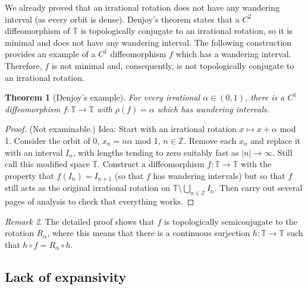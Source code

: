 \documentclass[12pt]{article}
\newtheorem{theorem}{Theorem}[section]
\theoremstyle{definition}
\theoremstyle{remark}
\newtheorem{remark}[theorem]{Remark}
\begin{document}
We already proved that an irrational rotation does not have any wandering
interval (as every orbit is dense). Denjoy's theorem states that a $C^2$
diffeomorphism of $\mathbb T$ is topologically conjugate to an irrational rotation, so
it is minimal and does not have any wandering interval.
The following construction provides an example of a $C^1$ diffeomorphism $f$
which has a wandering interval. Therefore, $f$ is not minimal and, consequently,
is not topologically conjugate to an irrational rotation.



\begin{theorem} [Denjoy's example]
For every irrational $\alpha \in (0,1)$, there is a $C^1$ diffeomorphism $f : \mathbb T \to \mathbb T$ with 
$\rho(f)=\alpha$ which has wandering intervals.
\end{theorem}

\begin{proof}
(Not examinable.) %
Idea: Start with an irrational rotation $x \mapsto x+\alpha$ mod 1. 
Consider the orbit of $0$, $x_n = n\alpha$ mod 1, $n \in \mathbb Z$. Remove each $x_n$ and replace it with 
an interval $I_n$, with lengths tending to zero suitably fast as $|n| \to \infty$. Still call this modified space $\mathbb T$.
Construct a diffeomorphism $f : \mathbb T \to \mathbb T$ with the property that $f(I_n) =I_{n+1}$ 
(so that $f$ has wandering intervals) but so that $f$ still acts as the original irrational rotation on $\mathbb T \setminus \bigcup_{n\in \mathbb Z} I_n$.
Then carry out several pages of analysis to check that everything works.
\end{proof}

\begin{remark}
The detailed proof shows that $f$ is topologically semiconjugate to the rotation $R_\alpha$, where this means that there is a continuous surjection $h : \mathbb T \to \mathbb T$ such that
$h \circ f = R_\alpha \circ h$.
\end{remark}





\subsection{Lack of expansivity}
\end{document}
